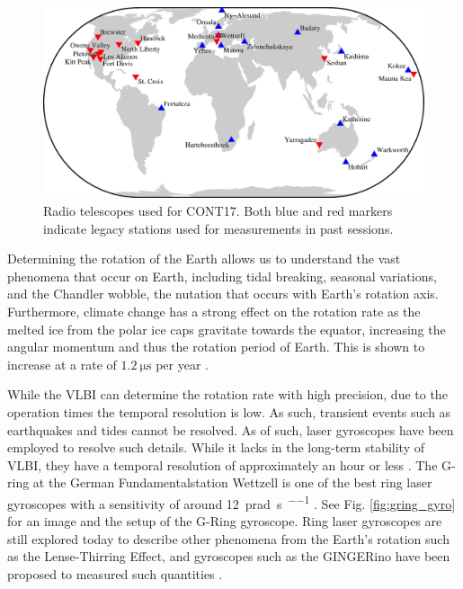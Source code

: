 \documentclass[a4paper]{report}
\numberwithin{equation}{section}
\begin{document}
\begin{figure}[h!]
	\centering
	\includegraphics[width=0.6\columnwidth]{cont17_legacy.jpg}
	\caption{Radio telescopes used for CONT17. Both blue and red markers
	indicate legacy stations used for measurements in past sessions.}
	\label{fig:vlbi_locs}
\end{figure}


Determining the rotation of the Earth allows us to understand the vast phenomena that occur on Earth,
including tidal breaking, seasonal variations, and the Chandler wobble, the nutation that occurs with Earth's
rotation axis. Furthermore, climate change has a strong effect on the rotation rate as the melted ice from the 
polar ice caps gravitate towards the equator, increasing the angular momentum and thus the rotation period of Earth.
This is shown to increase at a rate of $\SI{1.2}{\micro\second}$ per year \cite{Groh2021}. \par 

While the VLBI can determine the rotation rate with high precision, due to the operation times the temporal resolution
is low. As such, transient events such as earthquakes and tides cannot be resolved. As of such, 
laser gyroscopes have been employed to resolve such details. While it lacks in the long-term stability of VLBI,
they have a temporal resolution of approximately an hour or less \cite{Wettzell2005}. The G-ring at the German
Fundamentalstation Wettzell is one of the best ring laser gyroscopes with a sensitivity of around \SI{12}{\pico\radian\per\second\per\sqrt{\hertz}} \cite{Groh2021}. 
See Fig. \ref{fig:gring_gyro} for an image and the setup of the G-Ring gyroscope. Ring laser gyroscopes are still explored today to 
describe other phenomena from the Earth's rotation such as the Lense-Thirring Effect, and gyroscopes such as the GINGERino have been proposed to 
measured such quantities \cite{Beverini2016}.
\end{document}
